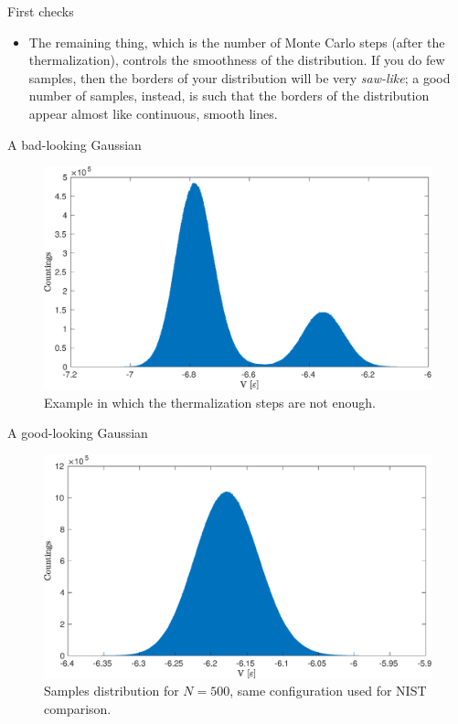 \documentclass[10pt, compress, protectframetitle, handout]{beamer}
\begin{document}
\begin{frame}[allowframebreaks]{First checks}
\begin{itemize}
\begin{itemize}
			\item The remaining thing, which is the number of Monte Carlo steps (after the thermalization), controls the \alert{smoothness} of the distribution. If you do few samples, then the borders of your distribution will be very \emph{saw-like}; a good number of samples, instead, is such that the borders of the distribution appear almost like continuous, smooth lines.
		\end{itemize}
	\end{itemize}
	
\end{frame}

\begin{frame}{A bad-looking Gaussian}
	\begin{figure}
		\centering
		\includegraphics[width=\textwidth]{distribution_bad}
		\caption{Example in which the thermalization steps are not enough.}
		\label{fig:example_distribution_bad}
	\end{figure}
\end{frame}

\begin{frame}{A good-looking Gaussian}
	\begin{figure}
		\centering
		\includegraphics[width=\textwidth]{distribution500}
		\caption{Samples distribution for $N=500$, same configuration used for NIST comparison.}
		\label{fig:example_distribution_good}
	\end{figure}
\end{frame}
\end{document}
